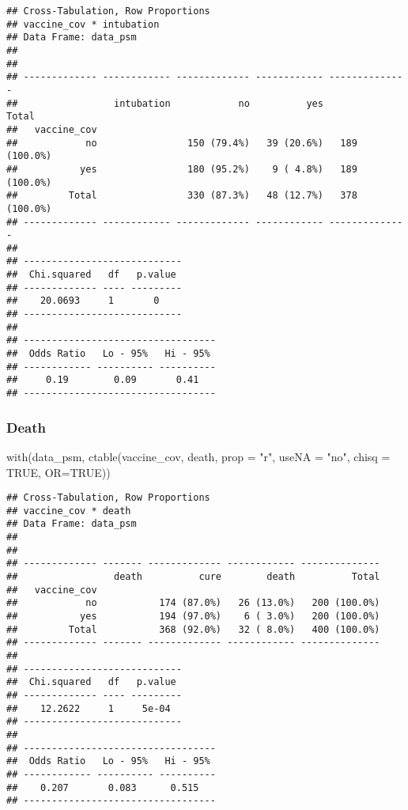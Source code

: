 \documentclass[
]{article}
\newenvironment{Shaded}{\begin{snugshade}}{\end{snugshade}}
\newcommand{\AttributeTok}[1]{\textcolor[rgb]{0.77,0.63,0.00}{#1}}
\newcommand{\ConstantTok}[1]{\textcolor[rgb]{0.00,0.00,0.00}{#1}}
\newcommand{\FunctionTok}[1]{\textcolor[rgb]{0.00,0.00,0.00}{#1}}
\newcommand{\NormalTok}[1]{#1}
\newcommand{\StringTok}[1]{\textcolor[rgb]{0.31,0.60,0.02}{#1}}
\begin{document}
\begin{verbatim}
## Cross-Tabulation, Row Proportions  
## vaccine_cov * intubation  
## Data Frame: data_psm  
## 
## 
## ------------- ------------ ------------- ------------ --------------
##                 intubation            no          yes          Total
##   vaccine_cov                                                       
##            no                150 (79.4%)   39 (20.6%)   189 (100.0%)
##           yes                180 (95.2%)    9 ( 4.8%)   189 (100.0%)
##         Total                330 (87.3%)   48 (12.7%)   378 (100.0%)
## ------------- ------------ ------------- ------------ --------------
## 
## ----------------------------
##  Chi.squared   df   p.value 
## ------------- ---- ---------
##    20.0693     1       0    
## ----------------------------
## 
## ----------------------------------
##  Odds Ratio   Lo - 95%   Hi - 95% 
## ------------ ---------- ----------
##     0.19        0.09       0.41   
## ----------------------------------
\end{verbatim}

\hypertarget{death-1}{%
\subsubsection{Death}\label{death-1}}

\begin{Shaded}
\begin{Highlighting}[]
\FunctionTok{with}\NormalTok{(data\_psm, }\FunctionTok{ctable}\NormalTok{(vaccine\_cov, death, }\AttributeTok{prop =} \StringTok{"r"}\NormalTok{, }\AttributeTok{useNA =} \StringTok{"no"}\NormalTok{, }\AttributeTok{chisq =} \ConstantTok{TRUE}\NormalTok{, }\AttributeTok{OR=}\ConstantTok{TRUE}\NormalTok{))}
\end{Highlighting}
\end{Shaded}

\begin{verbatim}
## Cross-Tabulation, Row Proportions  
## vaccine_cov * death  
## Data Frame: data_psm  
## 
## 
## ------------- ------- ------------- ------------ --------------
##                 death          cure        death          Total
##   vaccine_cov                                                  
##            no           174 (87.0%)   26 (13.0%)   200 (100.0%)
##           yes           194 (97.0%)    6 ( 3.0%)   200 (100.0%)
##         Total           368 (92.0%)   32 ( 8.0%)   400 (100.0%)
## ------------- ------- ------------- ------------ --------------
## 
## ----------------------------
##  Chi.squared   df   p.value 
## ------------- ---- ---------
##    12.2622     1     5e-04  
## ----------------------------
## 
## ----------------------------------
##  Odds Ratio   Lo - 95%   Hi - 95% 
## ------------ ---------- ----------
##    0.207       0.083      0.515   
## ----------------------------------
\end{verbatim}
\end{document}
